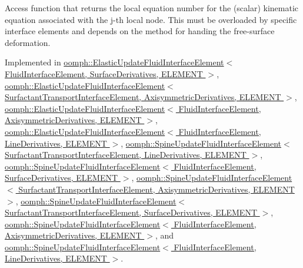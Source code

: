 Access function that returns the local equation number for the (scalar) kinematic equation associated with the j-\/th local node. This must be overloaded by specific interface elements and depends on the method for handing the free-\/surface deformation. 



Implemented in \hyperlink{classoomph_1_1ElasticUpdateFluidInterfaceElement_a940840693906b7b8d619ff97f521c811}{oomph\+::\+Elastic\+Update\+Fluid\+Interface\+Element$<$ Fluid\+Interface\+Element, Surface\+Derivatives, E\+L\+E\+M\+E\+N\+T $>$}, \hyperlink{classoomph_1_1ElasticUpdateFluidInterfaceElement_a940840693906b7b8d619ff97f521c811}{oomph\+::\+Elastic\+Update\+Fluid\+Interface\+Element$<$ Surfactant\+Transport\+Interface\+Element, Axisymmetric\+Derivatives, E\+L\+E\+M\+E\+N\+T $>$}, \hyperlink{classoomph_1_1ElasticUpdateFluidInterfaceElement_a940840693906b7b8d619ff97f521c811}{oomph\+::\+Elastic\+Update\+Fluid\+Interface\+Element$<$ Fluid\+Interface\+Element, Axisymmetric\+Derivatives, E\+L\+E\+M\+E\+N\+T $>$}, \hyperlink{classoomph_1_1ElasticUpdateFluidInterfaceElement_a940840693906b7b8d619ff97f521c811}{oomph\+::\+Elastic\+Update\+Fluid\+Interface\+Element$<$ Fluid\+Interface\+Element, Line\+Derivatives, E\+L\+E\+M\+E\+N\+T $>$}, \hyperlink{classoomph_1_1SpineUpdateFluidInterfaceElement_a94f737e046cb2796cb2b2dd5534bd3cd}{oomph\+::\+Spine\+Update\+Fluid\+Interface\+Element$<$ Surfactant\+Transport\+Interface\+Element, Line\+Derivatives, E\+L\+E\+M\+E\+N\+T $>$}, \hyperlink{classoomph_1_1SpineUpdateFluidInterfaceElement_a94f737e046cb2796cb2b2dd5534bd3cd}{oomph\+::\+Spine\+Update\+Fluid\+Interface\+Element$<$ Fluid\+Interface\+Element, Surface\+Derivatives, E\+L\+E\+M\+E\+N\+T $>$}, \hyperlink{classoomph_1_1SpineUpdateFluidInterfaceElement_a94f737e046cb2796cb2b2dd5534bd3cd}{oomph\+::\+Spine\+Update\+Fluid\+Interface\+Element$<$ Surfactant\+Transport\+Interface\+Element, Axisymmetric\+Derivatives, E\+L\+E\+M\+E\+N\+T $>$}, \hyperlink{classoomph_1_1SpineUpdateFluidInterfaceElement_a94f737e046cb2796cb2b2dd5534bd3cd}{oomph\+::\+Spine\+Update\+Fluid\+Interface\+Element$<$ Surfactant\+Transport\+Interface\+Element, Surface\+Derivatives, E\+L\+E\+M\+E\+N\+T $>$}, \hyperlink{classoomph_1_1SpineUpdateFluidInterfaceElement_a94f737e046cb2796cb2b2dd5534bd3cd}{oomph\+::\+Spine\+Update\+Fluid\+Interface\+Element$<$ Fluid\+Interface\+Element, Axisymmetric\+Derivatives, E\+L\+E\+M\+E\+N\+T $>$}, and \hyperlink{classoomph_1_1SpineUpdateFluidInterfaceElement_a94f737e046cb2796cb2b2dd5534bd3cd}{oomph\+::\+Spine\+Update\+Fluid\+Interface\+Element$<$ Fluid\+Interface\+Element, Line\+Derivatives, E\+L\+E\+M\+E\+N\+T $>$}.

